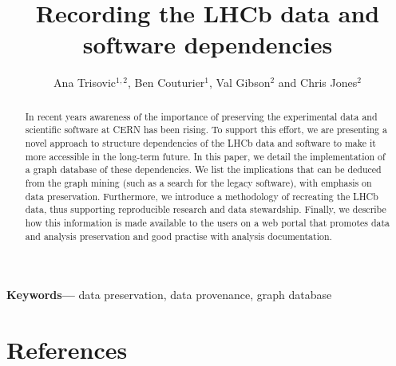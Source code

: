 \documentclass[a4paper]{jpconf}
\providecommand{\keywords}[1]{\qquad\textbf{Keywords---} #1}
\begin{document}
\title{Recording the LHCb data and software dependencies }


\author{Ana Trisovic$^{1,2}$, Ben Couturier$^1$, Val Gibson$^2$ and  Chris Jones$^2$  }
\address{$^1$ CERN, Geneva, Switzerland}
\address{$^2$ University of Cambridge, Cambridge, the United Kingdom}

\begin{abstract}

In recent years awareness of the importance of preserving the experimental data and scientific software at CERN has been rising. To support this effort, we are presenting a novel approach to structure dependencies of the LHCb data and software to make it more accessible in the long-term future. In this paper, we detail the implementation of a graph database of these dependencies. We list the implications that can be deduced from the graph mining (such as a search for the legacy software), with emphasis on data preservation. Furthermore, we introduce a methodology of recreating the LHCb data, thus supporting reproducible research and data stewardship. Finally, we describe how this information is made available to the users on a web portal that promotes data and analysis preservation and good practise with analysis documentation.

\end{abstract}
\keywords{data preservation, data provenance, graph database}

{
\setlength{\parskip}{0.5em}













\section*{References}


}
\end{document}
